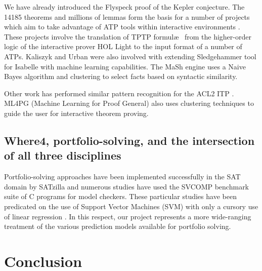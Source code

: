 We have already introduced the Flyspeck \cite{hales-kepler} proof of the Kepler conjecture. The 14185 theorems and millions of lemmas form the basis for a number of projects which aim to take advantage of ATP tools within interactive environments \cite{Flyspec, Kaliszyk2015109}. These projects involve the translation of TPTP formul\ae~  from the higher-order logic of the  interactive prover \textsf{HOL Light} to the input format of a number of ATPs. Kaliszyk and Urban were also involved with extending Sledgehammer \cite{threeyears} tool for Isabelle \cite{Isabelle} with machine learning capabilities. The MaSh \cite{Sledgehammer} engine uses a Naive Bayes algorithm and clustering to select facts based on syntactic similarity.       

Other work has performed similar pattern recognition for the ACL2 ITP \cite{Heras2013}. ML4PG (Machine Learning for Proof General) \cite{ML4PG} also uses clustering techniques to guide the user for interactive theorem proving.

\subsection{Where4, portfolio-solving, and the intersection of all three disciplines}
\label{sub:lrsvmmml}

Portfolio-solving approaches have been implemented successfully in the SAT domain by SATzilla \cite{Satzilla} and numerous studies \cite{MUX, DPVZ15:CAV} have used the SVCOMP \cite{SVCOMP} benchmark suite of C programs for model checkers. These particular studies have been predicated on the use of Support Vector Machines (SVM) with only a cursory use of linear regression \cite{MUX}. In this respect, our project represents a more wide-ranging treatment of the various prediction models available for portfolio solving.

\section{Conclusion}
